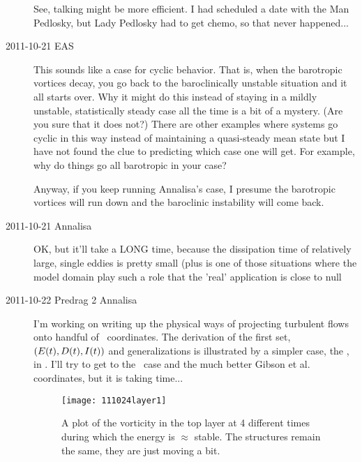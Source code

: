 \begin{description}
See, talking might be more efficient. I had scheduled a date with
the Man Pedlosky, but Lady Pedlosky had to get chemo, so that never
happened...

\item[2011-10-21 EAS]
This sounds like a case for cyclic behavior.  That is, when the
barotropic vortices decay, you go back to the baroclinically unstable
situation and it all starts over.   Why it might do this instead of
staying in a mildly unstable, statistically steady case all the time
is a bit of a mystery.  (Are you sure that it does not?)   There are
other examples where systems go cyclic in this way instead of
maintaining a quasi-steady mean state but I have not found the
clue to predicting which case one will get.  For example, why do
things go all barotropic in your case?

Anyway, if you keep running Annalisa's case, I presume the
barotropic vortices will run down and the baroclinic instability
will come back.

\item[2011-10-21 Annalisa]
OK, but it'll take a LONG time, because the dissipation time of
relatively large, single eddies is pretty small (plus is one of those
situations where the model domain play such a role that the 'real'
application is close to null

\item[2011-10-22 Predrag 2 Annalisa] I'm working on writing up
the physical ways of projecting turbulent flows onto handful of
\statesp\ coordinates. The derivation of the first set,
$(E(t),D(t),I(t))$ and generalizations is illustrated by
a simpler case, the \KSe, in . I'll try to get to
the \NS\ case and the much better Gibson et al. coordinates, but it
is taking time...

\begin{figure}[t]
\begin{center}
    \texttt{[image: 111024layer1]}
\end{center}
\caption{
A plot of the vorticity in the top layer at 4 different times during
which the energy is $\approx$ stable. The structures remain the same,
they are just moving a bit.
        }
\label{f:111024layer1}
\end{figure}


\end{description}

